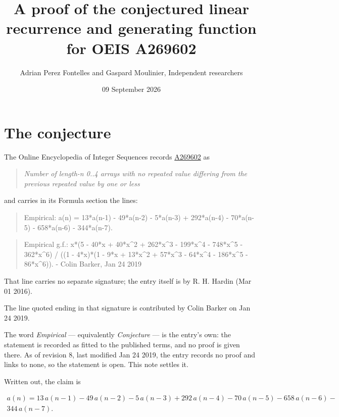 \documentclass[11pt]{article}
\title{A proof of the conjectured linear recurrence and generating function for OEIS A269602}
\author{Adrian Perez Fontelles and Gaspard Moulinier, Independent researchers}
\date{09 September 2026}
\theoremstyle{definition}
\begin{document}
\maketitle
\section{The conjecture}

The Online Encyclopedia of Integer Sequences records \href{https://oeis.org/A269602}{A269602} as

\begin{quote}\itshape Number of length-n 0..4 arrays with no repeated value differing from the previous repeated value by one or less\end{quote}

and carries in its Formula section the lines:

\begin{quote}\ttfamily Empirical: a(n) = 13*a(n-1) - 49*a(n-2) - 5*a(n-3) + 292*a(n-4) - 70*a(n-5) - 658*a(n-6) - 344*a(n-7).\end{quote}

\begin{quote}\ttfamily Empirical g.f.: x*(5 - 40*x + 40*x\textasciicircum{}2 + 262*x\textasciicircum{}3 - 199*x\textasciicircum{}4 - 748*x\textasciicircum{}5 - 362*x\textasciicircum{}6) / ((1 - 4*x)*(1 - 9*x + 13*x\textasciicircum{}2 + 57*x\textasciicircum{}3 - 64*x\textasciicircum{}4 - 186*x\textasciicircum{}5 - 86*x\textasciicircum{}6)). - Colin Barker, Jan 24 2019\end{quote}

That line carries no separate signature; the entry itself is by R. H. Hardin (Mar 01 2016).

The line quoted ending in that signature is contributed by Colin Barker on Jan 24 2019.

The word {\itshape Empirical} --- equivalently {\itshape Conjecture} --- is the entry's own: the statement is recorded as fitted to the published terms, and no proof is given there. As of revision 8, last modified Jan 24 2019, the entry records no proof and links to none, so the statement is open. This note settles it.

Written out, the claim is

\begin{multline*} a(n) = 13\,a(n-1) - 49\,a(n-2) - 5\,a(n-3) + 292\,a(n-4) - 70\,a(n-5) - 658\,a(n-6) - \\ 344\,a(n-7). \end{multline*}
\end{document}
